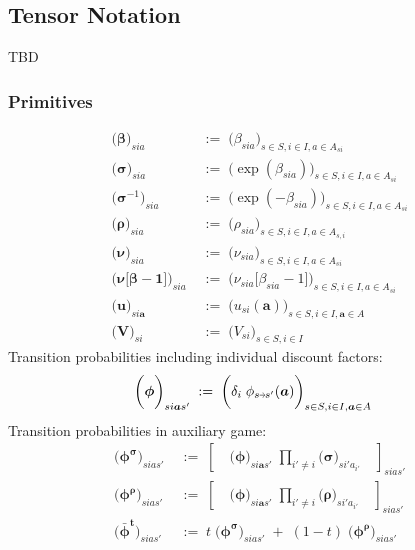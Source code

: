 \documentclass[11pt,fleqn]{article}
\newcommand{\bsigma}{\bm{\sigma}}
\newcommand{\bbeta}{\bm{\beta}}
\newcommand{\brho}{\bm{\rho}}
\newcommand{\bV}{\bm{V}}
\newcommand{\bnu}{\bm{\nu}}
\newcommand{\bone}{\bm{1}}
\newcommand{\ba}{\bm{a}}
\newcommand{\shortrightarrow}{\parbox{4pt}{\tikz{\draw[->](0,0)--(4pt,0);}}}
\newcommand{\phiss}{\phi_{s\shortrightarrow s'}}
\begin{document}
\subsection*{Tensor Notation}


TBD


\subsubsection*{Primitives}

\begin{align*}
	\biggl( \bbeta \biggr)_{sia} & \;:=\; \biggl( \beta_{sia} \biggr)_{s\in S, i\in I,a \in A_{si}} \\
	\biggl( \bsigma \biggr)_{sia} & \;:=\; \biggl( \exp(\beta_{sia}) \biggr)_{s\in S, i\in I,a \in A_{si}} \\
	\biggl( \bsigma^{-1} \biggr)_{sia} & \;:=\; \biggl( \exp(-\beta_{sia}) \biggr)_{s\in S, i\in I,a \in A_{si}} \\
	\biggl( \brho \biggr)_{sia} & \;:=\; \biggl( \rho_{sia} \biggr)_{s\in S, i\in I, a\in A_{s,i}} \\
	\biggl( \bnu \biggr)_{sia} & \;:=\; \biggl( \nu_{sia} \biggr)_{s\in S, i\in I, a\in A_{si}} \\
	\biggl( \bnu\bigl[\bbeta-\bone\bigr] \biggr)_{sia} & \;:=\; \biggl( \nu_{sia}\bigl[\beta_{sia}-1\bigr] \biggr)_{s\in S, i\in I, a\in A_{si}} \\
	\biggl( \bm{u} \biggr)_{si\ba} & \;:=\; \biggl( u_{si}(\ba) \biggr)_{s\in S, i\in I, \ba\in A} \\
	\biggl( \bV \biggr)_{si} & \;:=\; \biggl( V_{si} \biggr)_{s\in S, i\in I}
\end{align*}
Transition probabilities including individual discount factors:
\begin{align*}
	\biggl( \bm{\phi} \biggr)_{si\ba s'} & \;:=\; \biggl( \delta_i \; \phiss(\ba) \biggr)_{s\in S, i\in I, \ba\in A}
\end{align*}
Transition probabilities in auxiliary game:
\begin{align*}
	\biggl( \bm{\phi^{\sigma}} \biggr)_{sias'} & \;:=\; \left[ \quad \biggl( \bm{\phi} \biggr)_{si\ba s'} \; \prod\limits_{i'\neq i} \biggl( \bsigma \biggr)_{si'a_{i'}} \quad \right]_{sias'} \\
	\biggl( \bm{\phi^{\rho}} \biggr)_{sias'} & \;:=\; \left[ \quad \biggl( \bm{\phi} \biggr)_{si\ba s'} \; \prod\limits_{i'\neq i} \biggl( \brho \biggr)_{si'a_{i'}} \quad \right]_{sias'} \\
	\biggl( \bm{{\bar{\phi}^t}} \biggr)_{sias'} & \;:=\; t \; \biggl( \bm{\phi^{\sigma}} \biggr)_{sias'} \;+\; (1-t) \; \biggl( \bm{\phi^{\rho}} \biggr)_{sias'}
\end{align*}
\end{document}
